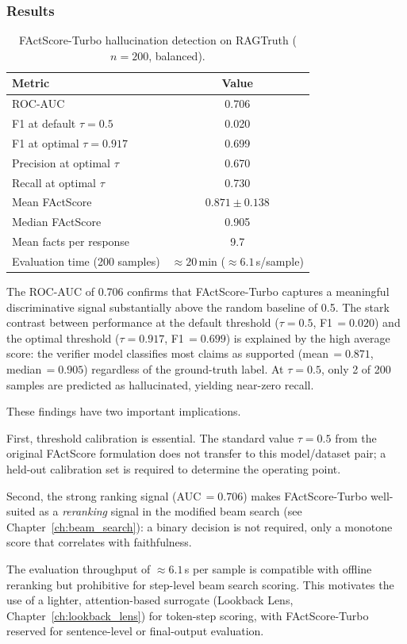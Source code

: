 \subsubsection{Results}

\begin{table}[h]
  \centering
  \caption{FActScore-Turbo hallucination detection on RAGTruth ($n = 200$, balanced).}
  \label{tab:factscore_results}
  \begin{tabular}{lc}
    \toprule
    Metric                             & Value  \\
    \midrule
    ROC-AUC                            & 0.706  \\
    F1 at default $\tau = 0.5$         & 0.020  \\
    F1 at optimal $\tau = 0.917$       & 0.699  \\
    Precision at optimal $\tau$        & 0.670  \\
    Recall at optimal $\tau$           & 0.730  \\
    Mean FActScore                     & $0.871 \pm 0.138$ \\
    Median FActScore                   & 0.905  \\
    Mean facts per response            & 9.7    \\
    Evaluation time (200 samples)      & ${\approx}20$\,min (${\approx}6.1$\,s/sample) \\
    \bottomrule
  \end{tabular}
\end{table}

The ROC-AUC of 0.706 confirms that FActScore-Turbo captures a meaningful discriminative
signal substantially above the random baseline of 0.5.  The stark contrast between
performance at the default threshold ($\tau = 0.5$, F1\,$= 0.020$) and the optimal threshold
($\tau = 0.917$, F1\,$= 0.699$) is explained by the high average score: the verifier model
classifies most claims as supported (mean\,$= 0.871$, median\,$= 0.905$) regardless of the
ground-truth label.  At $\tau = 0.5$, only 2 of 200 samples are predicted as hallucinated,
yielding near-zero recall.

These findings have two important implications.

First, threshold calibration is essential.  The standard value $\tau = 0.5$ from the original
FActScore formulation does not transfer to this model/dataset pair; a held-out calibration set
is required to determine the operating point.

Second, the strong ranking signal (AUC\,$= 0.706$) makes FActScore-Turbo well-suited as a
\emph{reranking} signal in the modified beam search (see Chapter~\ref{ch:beam_search}): a
binary decision is not required, only a monotone score that correlates with faithfulness.

The evaluation throughput of ${\approx}6.1$\,s per sample is compatible with offline
reranking but prohibitive for step-level beam search scoring.  This motivates the use of a
lighter, attention-based surrogate (Lookback Lens,
Chapter~\ref{ch:lookback_lens}) for token-step scoring, with FActScore-Turbo reserved for
sentence-level or final-output evaluation.
